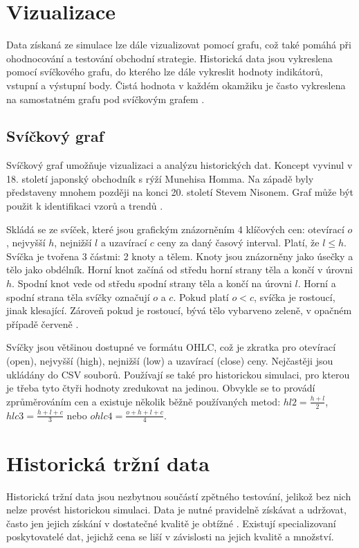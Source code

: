 \section{Vizualizace}
Data získaná ze simulace lze dále vizualizovat pomocí grafu, což také pomáhá při ohodnocování a testování obchodní strategie.
Historická data jsou vykreslena pomocí svíčkového grafu, do kterého lze dále vykreslit hodnoty indikátorů, vstupní a výstupní body.
Čistá hodnota v každém okamžiku je často vykreslena na samostatném grafu pod svíčkovým grafem \cite{pardo}.

\subsection{Svíčkový graf}
Svíčkový graf umožňuje vizualizaci a analýzu historických dat.
Koncept vyvinul v 18. století japonský obchodník s rýží Munehisa Homma.
Na západě byly představeny mnohem později na konci 20. století Stevem Nisonem.
Graf může být použit k identifikaci vzorů a trendů \cite{candlestick-corporate}.

Skládá se ze svíček, které jsou grafickým znázorněním 4 klíčových cen: otevírací $o$, nejvyšší $h$, nejnižší $l$ a uzavírací $c$ ceny za daný časový interval.
Platí, že $l\leq h$.
Svíčka je tvořena 3 částmi: 2 knoty a tělem.
Knoty jsou znázorněny jako úsečky a tělo jako obdélník.
Horní knot začíná od středu horní strany těla a končí v úrovni $h$.
Spodní knot vede od středu spodní strany těla a končí na úrovni $l$.
Horní a spodní strana těla svíčky označují $o$ a $c$.
Pokud platí $o<c$, svíčka je rostoucí, jinak klesající.
Zároveň pokud je rostoucí, bývá tělo vybarveno zeleně, v opačném případě červeně \cite{candlestick-corporate}.

Svíčky jsou většinou dostupné ve formátu OHLC, což je zkratka pro otevírací (open), nejvyšší (high), nejnižší (low) a uzavírací (close) ceny.
Nejčastěji jsou ukládány do CSV souborů.
Používají se také pro historickou simulaci, pro kterou je třeba tyto čtyři hodnoty zredukovat na jedinou.
Obvykle se to provádí zprůměrováním cen a existuje několik běžně používaných metod: $hl2=\frac{h+l}{2}$, $hlc3=\frac{h+l+c}{3}$ nebo $ohlc4=\frac{o+h+l+c}{4}$.

\section{Historická tržní data}
Historická tržní data jsou nezbytnou součástí zpětného testování, jelikož bez nich nelze provést historickou simulaci.
Data je nutné pravidelně získávat a udržovat, často jen jejich získání v dostatečné kvalitě je obtížné \cite{pardo}.
Existují specializovaní poskytovatelé dat, jejichž cena se liší v závislosti na jejich kvalitě a množství.


